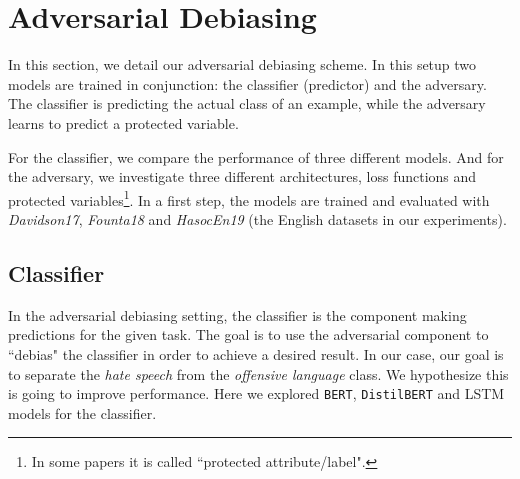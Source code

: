 \documentclass[11pt]{article}
\begin{document}
	
	\section{Adversarial Debiasing}
	
	In this section, we detail our adversarial debiasing scheme. In this setup two models are trained in conjunction: the classifier (predictor) and the adversary. The classifier is predicting the actual class of an example, while the adversary learns to predict a protected variable.
	
	For the classifier, we compare the performance of three different models. And for the adversary, we investigate three different architectures, loss functions and protected variables\footnote{In some papers it is called ``protected attribute/label".}. In a first step, the models are trained and evaluated with \textit{Davidson17}, \textit{Founta18} and \textit{HasocEn19} (the English datasets in our experiments).
	
	\subsection{Classifier}
	
	In the adversarial debiasing setting, the classifier is the component making predictions for the given task. The goal is to use the adversarial component to ``debias" the classifier in order to achieve a desired result. In our case, our goal is to separate the \textit{hate speech} from the \textit{offensive language} class. We hypothesize this is going to improve performance. Here we explored \texttt{BERT}, \texttt{DistilBERT} and LSTM models for the classifier.
	
\end{document}
